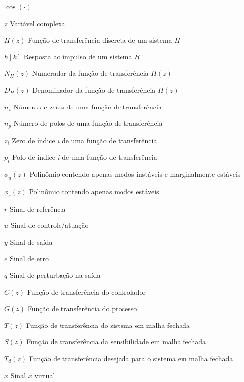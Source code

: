 \documentclass[repeatfields,oneside,overleaf]{tcc}
\begin{document}
\begin{listofsymbols}{$ \cos(\cdot) $}
    \item[$ z $] Variável complexa
    \item[$ H(z) $] Função de transferência discreta de um sistema $H$
    \item[$ h {[k]} $] Resposta ao impulso de um sistema $H$

    \item[$ N_H(z) $] Numerador da função de transferência $H(z)$
    \item[$ D_H(z) $] Denominador da função de transferência $H(z)$

    \item[$ n_z $] Número de zeros de uma função de transferência
    \item[$ n_p $] Número de polos de uma função de transferência

    \item[$ z_i $] Zero de índice $i$ de uma função de transferência
    \item[$ p_i $] Polo de índice $i$ de uma função de transferência

    \item[$ \phi_u(z) $] Polinômio contendo apenas modos instáveis e marginalmente estáveis
    \item[$ \phi_s(z) $] Polinômio contendo apenas modos estáveis


    \item[$ r $] Sinal de referência
    \item[$ u $] Sinal de controle\slash{}atuação
    \item[$ y $] Sinal de saída
    \item[$ e $] Sinal de erro
    \item[$ q $] Sinal de perturbação na saída

    \item[$ C(z) $] Função de transferência do controlador
    \item[$ G(z) $] Função de transferência do processo
    \item[$ T(z) $] Função de transferência do sistema em malha fechada
    \item[$ S(z) $] Função de transferência da sensibilidade em malha fechada

    \item[$ T_d(z) $] Função de transferência desejada para o sistema em malha fechada

    \item[$ \overline{x} $] Sinal $x$ virtual


\end{listofsymbols}
\end{document}
